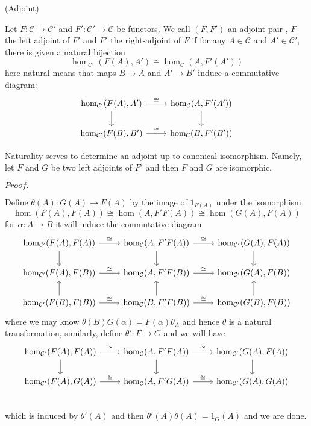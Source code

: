 \documentclass{article}
\newcommand{\Pf}[1]{$Proof.$\par}
\begin{document}
\begin{definition}
    (Adjoint)\par
    Let $F:\mathcal{C} \to  \mathcal{C}'$ and $F':\mathcal{C}' \to  \mathcal{C}$ be functors. We call $(F,F')$ an adjoint pair , $F$ the left adjoint of $F'$ and $F'$ the right-adjoint of $F$ if for any $A\in\mathcal{C}$ and $A'\in\mathcal{C'}$, there is given a natural bijection
    \[\hom_{\mathcal{C'}}(F(A),A') \cong \hom_{\mathcal{C}}(A,F'(A'))\]
    here natural means that maps $B\to A$ and $A'\to B'$ induce a commutative diagram:
    \[
    \begin{tikzcd}
        \hom_{\mathcal{C'}}(F(A),A')\arrow[d]\arrow[r,"\cong"]& \hom_{\mathcal{C}}(A,F'(A'))\arrow[d] \\
        \hom_{\mathcal{C'}}(F(B),B')\arrow[r,"\cong"] & \hom_{\mathcal{C}}(B,F'(B'))
    \end{tikzcd}
    \]
\end{definition}

\begin{proposition}
    Naturality serves to determine an adjoint up to canonical isomorphism. Namely, let $F$ and $G$ be two left adjoints of $F'$ and then $F$ and $G$ are isomorphic.
\end{proposition}
\Pf\par
    Define $\theta(A):G(A) \to F(A)$ by the image of $1_{F(A)}$ under the isomorphism
    \[\hom(F(A),F(A))\cong \hom(A,F'F(A)) \cong \hom(G(A),F(A))\]
    for $\alpha:A\to B$ it will induce the commutative diagram
    \[
    \begin{tikzcd}
        \hom_{\mathcal{C'}}(F(A),F(A))\arrow[d]\arrow[r,"\cong"]& \hom_{\mathcal{C}}(A,F'F(A))\arrow[d]\arrow[r,"\cong"]& \hom_{\mathcal{C'}}(G(A),F(A))\arrow[d] \\
        \hom_{\mathcal{C'}}(F(A),F(B))\arrow[r,"\cong"]&\hom_{\mathcal{C}}(A,F'F(B))\arrow[r,"\cong"] & \hom_{\mathcal{C'}}(G(A),F(B)) \\
        \hom_{\mathcal{C'}}(F(B),F(B))\arrow[u]\arrow[r,"\cong"]&\hom_{\mathcal{C}}(B,F'F(B))\arrow[r,"\cong"]\arrow[u] & \hom_{\mathcal{C'}}(G(B),F(B))\arrow[u] 
    \end{tikzcd}
    \]
    where we may know $\theta(B)G(\alpha) = F(\alpha)\theta_A$ and hence $\theta$ is a natural transformation, similarly, define $\theta':F\to G$ and we will have
    \[
    \begin{tikzcd}
        \hom_{\mathcal{C'}}(F(A),F(A))\arrow[d]\arrow[r,"\cong"]& \hom_{\mathcal{C}}(A,F'F(A))\arrow[d]\arrow[r,"\cong"]& \hom_{\mathcal{C'}}(G(A),F(A))\arrow[d] \\
        \hom_{\mathcal{C'}}(F(A),G(A))\arrow[r,"\cong"]&\hom_{\mathcal{C}}(A,F'G(A))\arrow[r,"\cong"] & \hom_{\mathcal{C'}}(G(A),G(A)) \\ 
    \end{tikzcd}
    \]
    which is induced by $\theta'(A)$ and then $\theta'(A)\theta(A) = 1_G(A)$ and we are done.
\end{document}
